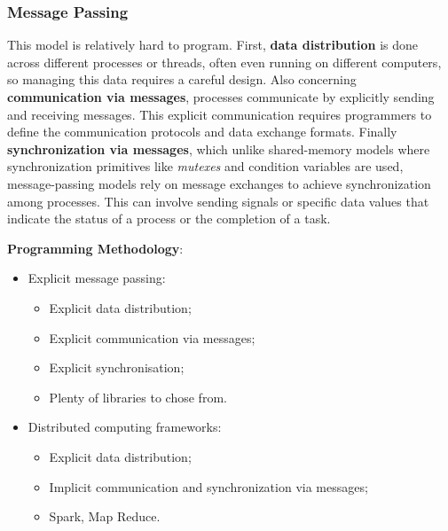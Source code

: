 \subsubsection{Message Passing}
\par This model is relatively hard to program. First, \textbf{data distribution} is done across different processes or threads, often even running on different computers, so managing this data requires a careful  design. Also concerning \textbf{communication via messages}, processes communicate by explicitly sending and receiving messages.  This explicit communication requires programmers to define the communication protocols and data exchange formats. Finally \textbf{synchronization via messages}, which unlike shared-memory models where synchronization primitives like \textit{mutexes} and condition variables are used, message-passing models rely on message exchanges to achieve synchronization among processes. This can involve sending signals or specific data values that indicate the status of a process or the completion of a task.
%
\clearpage
%
\begin{minipage}{0.5\textwidth}
    \par \textbf{Programming Methodology}:
  \begin{itemize}
      \item Explicit message passing:
      \begin{itemize}
          \item Explicit data distribution;
          \item Explicit communication via messages;
          \item Explicit synchronisation;
          \item Plenty of libraries to chose from.
      \end{itemize}
      \item Distributed computing frameworks:
      \begin{itemize}
          \item Explicit data distribution;
          \item Implicit communication and synchronization via messages;
          \item Spark, Map Reduce.
      \end{itemize}
  \end{itemize}
\end{minipage}
\begin{minipage}{0.5\textwidth}
    \centering
\end{minipage}
